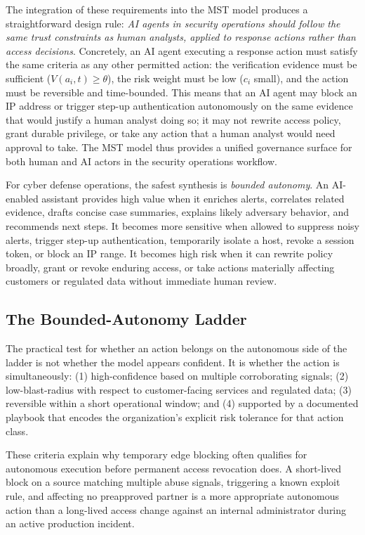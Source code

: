 \documentclass[unnumsec,webpdf,contemporary,large]{oup-authoring-template}
\theoremstyle{thmstyleone}
\theoremstyle{thmstyletwo}
\theoremstyle{thmstylethree}
\begin{document}
The integration of these requirements into the MST model produces a straightforward
design rule: \textit{AI agents in security operations should follow the same
trust constraints as human analysts, applied to response actions rather than access
decisions}. Concretely, an AI agent executing a response action must satisfy the
same criteria as any other permitted action: the verification evidence must be
sufficient ($V(a_i,t) \geq \theta$), the risk weight must be low ($c_i$ small),
and the action must be reversible and time-bounded. This means that an AI agent
may block an IP address or trigger step-up authentication autonomously on the
same evidence that would justify a human analyst doing so; it may not rewrite
access policy, grant durable privilege, or take any action that a human analyst
would need approval to take. The MST model thus provides a unified governance
surface for both human and AI actors in the security operations workflow.

For cyber defense operations, the safest synthesis is \textit{bounded autonomy}.
An AI-enabled assistant provides high value when it enriches alerts, correlates
related evidence, drafts concise case summaries, explains likely adversary behavior,
and recommends next steps. It becomes more sensitive when allowed to suppress noisy
alerts, trigger step-up authentication, temporarily isolate a host, revoke a session
token, or block an IP range. It becomes high risk when it can rewrite policy broadly,
grant or revoke enduring access, or take actions materially affecting customers or
regulated data without immediate human review.

\subsection{The Bounded-Autonomy Ladder}

The practical test for whether an action belongs on the autonomous side of the ladder
is not whether the model appears confident. It is whether the action is simultaneously:
(1) high-confidence based on multiple corroborating signals; (2) low-blast-radius
with respect to customer-facing services and regulated data; (3) reversible within a
short operational window; and (4) supported by a documented playbook that encodes the
organization's explicit risk tolerance for that action class.

These criteria explain why temporary edge blocking often qualifies for autonomous
execution before permanent access revocation does. A short-lived block on a source
matching multiple abuse signals, triggering a known exploit rule, and affecting no
preapproved partner is a more appropriate autonomous action than a long-lived access
change against an internal administrator during an active production incident.
\end{document}
